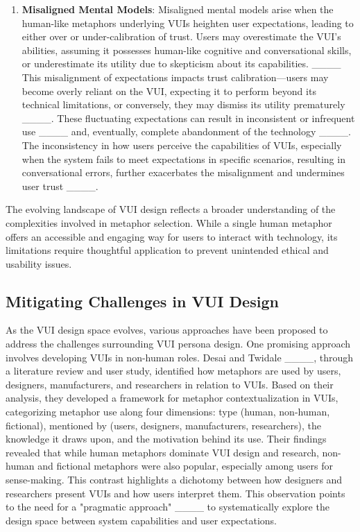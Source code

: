 \begin{enumerate}
\item \textbf{Misaligned Mental Models}:  Misaligned mental models arise when the human-like metaphors underlying VUIs heighten user expectations, leading to either over or under-calibration of trust. Users may overestimate the VUI's abilities, assuming it possesses human-like cognitive and conversational skills, or underestimate its utility due to skepticism about its capabilities. ____ This misalignment of expectations impacts trust calibration—users may become overly reliant on the VUI, expecting it to perform beyond its technical limitations, or conversely, they may dismiss its utility prematurely ____. These fluctuating expectations can result in inconsistent or infrequent use ____ and, eventually, complete abandonment of the technology ____. The inconsistency in how users perceive the capabilities of VUIs, especially when the system fails to meet expectations in specific scenarios, resulting in conversational errors, further exacerbates the misalignment and undermines user trust ____.

\end{enumerate}

The evolving landscape of VUI design reflects a broader understanding of the complexities involved in metaphor selection. While a single human metaphor offers an accessible and engaging way for users to interact with technology, its limitations require thoughtful application to prevent unintended ethical and usability issues.

\subsection{Mitigating Challenges in VUI Design}
\label{sec:mitigate}

As the VUI design space evolves, various approaches have been proposed to address the challenges surrounding VUI persona design. One promising approach involves developing VUIs in non-human roles. Desai and Twidale ____, through a literature review and user study, identified how metaphors are used by users, designers, manufacturers, and researchers in relation to VUIs. Based on their analysis, they developed a framework for metaphor contextualization in VUIs, categorizing metaphor use along four dimensions: type (human, non-human, fictional), mentioned by (users, designers, manufacturers, researchers), the knowledge it draws upon, and the motivation behind its use. Their findings revealed that while human metaphors dominate VUI design and research, non-human and fictional metaphors were also popular, especially among users for sense-making. This contrast highlights a dichotomy between how designers and researchers present VUIs and how users interpret them. This observation points to the need for a "pragmatic approach" ____ to systematically explore the design space between system capabilities and user expectations.

